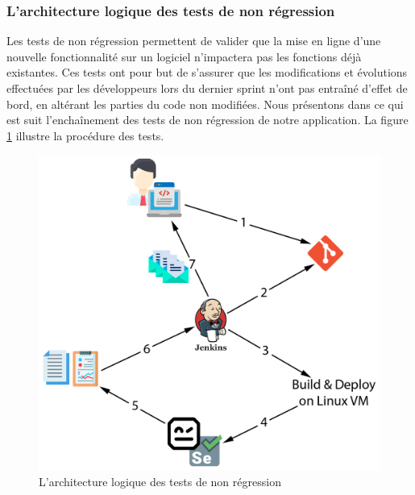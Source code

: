 \subsubsection{L'architecture logique des tests de non régression}
Les tests de non régression permettent de valider que la mise en ligne d’une nouvelle fonctionnalité sur un logiciel n’impactera pas les fonctions déjà existantes. Ces tests ont pour but de s’assurer que les modifications et évolutions effectuées par les développeurs lors du dernier sprint n’ont pas entraîné d’effet de bord, en altérant les parties du code non modifiées.\newpage
Nous présentons dans ce qui est suit l'enchaînement des tests de non régression de notre application. La figure \ref{fig:jenkins-schema} illustre la procédure des tests.
\begin{figure}[H]
	\centering
	\includegraphics[width=0.5\linewidth]{img/jenkins}
	\caption[L'architecture logique des tests de non régression]{L'architecture logique des tests de non régression}
	\label{fig:jenkins-schema}
\end{figure}

